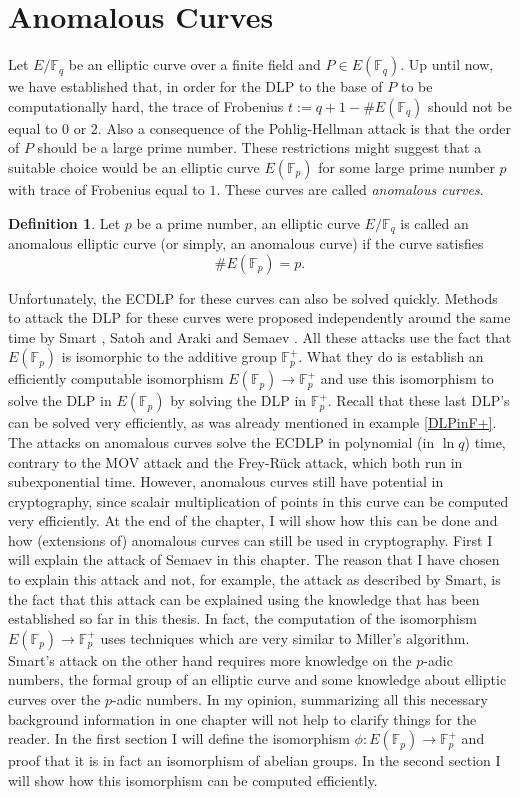 \documentclass{article}
\numberwithin{equation}{section}
\theoremstyle{definition}
\newtheorem{definition}[theorem]{Definition}
\newcommand{\FF}[1]{{\mathbb F}_{#1}} %
\begin{document}
\section{Anomalous Curves}\label{Anomalous}
\setcounter{theorem}{0}
Let $E/\FF{q}$ be an elliptic curve over a finite field and $P \in E(\FF{q})$. Up until now, we have established that, in order for the DLP to the base of $P$ to be computationally hard, the trace of Frobenius $t:=q+1-\#E(\FF{q})$ should not be equal to 0 or 2. Also a consequence of the Pohlig-Hellman attack is that the order of $P$ should be a large prime number. These restrictions might suggest that a suitable choice would be an elliptic curve $E(\FF{p})$ for some large prime number $p$ with trace of Frobenius equal to $1$. These curves are called \emph{anomalous curves}.

\begin{definition}
Let $p$ be a prime number, an elliptic curve $E/\FF{q}$ is called an anomalous elliptic curve (or simply, an anomalous curve) if the curve satisfies $$\#E(\FF{p})=p.$$
\end{definition}

Unfortunately, the ECDLP for these curves can also be solved quickly. Methods to attack the DLP for these curves were proposed independently around the same time by Smart \cite{Smart}, Satoh and Araki \cite{Satoh} and Semaev \cite{Semaev}. All these attacks use the fact that $E(\FF{p})$ is isomorphic to the additive group $\FF{p}^+$. What they do is establish an efficiently computable isomorphism $E(\FF{p}) \rightarrow \FF{p}^+$ and use this isomorphism to solve the DLP in $E(\FF{p})$ by solving the DLP in $\FF{p}^+$. Recall that these last DLP's can be solved very efficiently, as was already mentioned in example \ref{DLPinF+}. The attacks on anomalous curves solve the ECDLP in polynomial (in $\ln q$) time, contrary to the MOV attack and the Frey-R\"uck attack, which both run in subexponential time. However, anomalous curves still have potential in cryptography, since scalair multiplication of points in this curve can be computed very efficiently. At the end of the chapter, I will show how this can be done and how (extensions of) anomalous curves can still be used in cryptography. First I will explain the attack of Semaev in this chapter. The reason that I have chosen to explain this attack and not, for example, the attack as described by Smart, is the fact that this attack can be explained using the knowledge that has been established so far in this thesis. In fact, the computation of the isomorphism $E(\FF{p})\rightarrow \FF{p}^ +$ uses techniques which are very similar to Miller's algorithm. Smart's attack on the other hand requires more knowledge on the $p$-adic numbers, the formal group of an elliptic curve and some knowledge about elliptic curves over the $p$-adic numbers. In my opinion, summarizing all this necessary background information in one chapter will not help to clarify things for the reader. In the first section I will define the isomorphism $\phi:E(\FF{p}) \rightarrow \FF{p}^+$ and proof that it is in fact an isomorphism of abelian groups. In the second section I will show how this isomorphism can be computed efficiently. 
\end{document}

